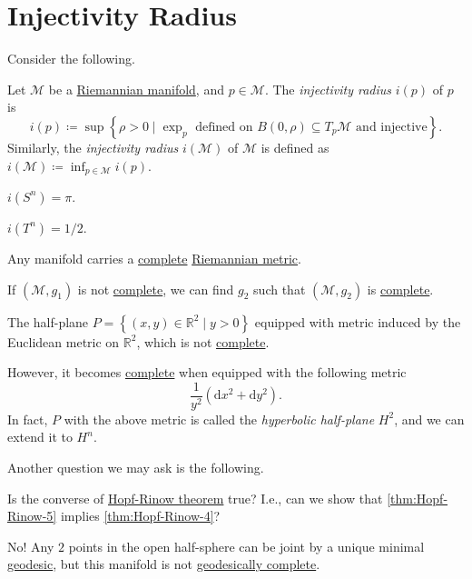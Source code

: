 \section{Injectivity Radius}
Consider the following.

\begin{definition}\label{def:injectivity-radius}
	Let \(\mathcal{M} \) be a \hyperref[def:Riemannian-manifold]{Riemannian manifold}, and \(p\in \mathcal{M} \). The \emph{injectivity radius} \(i(p)\) of \(p\) is
	\[
		i(p) \coloneqq \sup \left\{ \rho > 0 \mid \exp _p \text{ defined on \(B(0, \rho ) \subseteq T_p \mathcal{M} \) and injective} \right\}.
	\]
	Similarly, the \emph{injectivity radius} \(i(\mathcal{M} )\) of \(\mathcal{M} \) is defined as \(i(\mathcal{M} )\coloneqq \inf _{p\in \mathcal{M} }i(p)\).
\end{definition}

\begin{eg}[Sphere]
	\(i(S^n) = \pi \).
\end{eg}

\begin{eg}[Torus]
	\(i(T^n) = 1 / 2\).
\end{eg}

Any manifold carries a \hyperref[def:geodesically-complete]{complete} \hyperref[def:Riemannian-metric]{Riemannian metric}.

If \((\mathcal{M} , g_1)\) is not \hyperref[def:geodesically-complete]{complete}, we can find \(g_2\) such that \((\mathcal{M} , g_2)\) is \hyperref[def:geodesically-complete]{complete}.

\begin{eg}
	The half-plane \(P=\left\{ (x, y)\in \mathbb{R} ^2 \mid y > 0 \right\}\) equipped with metric induced by the Euclidean metric on \(\mathbb{R} ^2\), which is not \hyperref[def:geodesically-complete]{complete}.

	However, it becomes \hyperref[def:geodesically-complete]{complete} when equipped with the following metric
	\[
		\frac{1}{y^2} (\mathrm{d} x^2 + \mathrm{d} y^2).
	\]
	In fact, \(P\) with the above metric is called the \emph{hyperbolic half-plane} \(H^2\), and we can extend it to \(H^n \).
\end{eg}

Another question we may ask is the following.

\begin{problem*}
	Is the converse of \hyperref[thm:Hopf-Rinow]{Hopf-Rinow theorem} true? I.e., can we show that \autoref{thm:Hopf-Rinow-5} implies \autoref{thm:Hopf-Rinow-4}?
\end{problem*}
\begin{answer}
	No! Any \(2\) points in the open half-sphere can be joint by a unique minimal \hyperref[def:geodesic]{geodesic}, but this manifold is not \hyperref[def:geodesically-complete]{geodesically complete}.
\end{answer}

